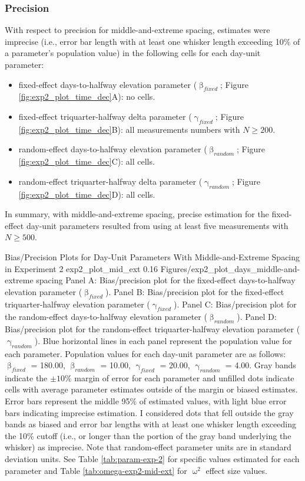 \documentclass[
12pt, %
twoside,
english]{guelphthesis}
\begin{document}
\hypertarget{precision-mid-ext-exp2}{%
\subsubsection{Precision}\label{precision-mid-ext-exp2}}

With respect to precision for middle-and-extreme spacing, estimates were imprecise (i.e., error bar length with at least one whisker length exceeding 10\% of a parameter's population value) in the following cells for each day-unit parameter:
\begin{itemize}
\tightlist
\item
  fixed-effect days-to-halfway elevation parameter (\(\upbeta_{fixed}\); Figure \ref{fig:exp2_plot_time_dec}A): no cells.
\item
  fixed-effect triquarter-halfway delta parameter (\(\upgamma_{fixed}\); Figure \ref{fig:exp2_plot_time_dec}B): all measurements numbers with \(N \ge 200\).
\item
  random-effect days-to-halfway elevation parameter (\(\upbeta_{random}\); Figure \ref{fig:exp2_plot_time_dec}C): all cells.
\item
  random-effect triquarter-halfway delta parameter (\(\upgamma_{random}\); Figure \ref{fig:exp2_plot_time_dec}D): all cells.
\end{itemize}
In summary, with middle-and-extreme spacing, precise estimation for the fixed-effect day-unit parameters resulted from using at least five measurements with \(N \ge 500\).
\begin{apaFigure}
[portrait]
[samepage]
[-0.2cm]
{Bias/Precision Plots for Day-Unit Parameters With Middle-and-Extreme Spacing in Experiment 2}
{exp2_plot_mid_ext}
{0.16}
{Figures/exp2_plot_days_middle-and-extreme spacing}
{Panel A: Bias/precision plot for the fixed-effect days-to-halfway elevation parameter ($\upbeta_{fixed}$). Panel B: Bias/precision plot for the fixed-effect triquarter-halfway elevation parameter ($\upgamma_{fixed}$). Panel C: Bias/precision plot for the random-effect days-to-halfway elevation parameter ($\upbeta_{random}$). Panel D: Bias/precision plot for the random-effect triquarter-halfway elevation parameter ($\upgamma_{random}$). Blue horizontal lines in each panel represent the population value for each parameter. Population values for each day-unit parameter are as follows: $\upbeta_{fixed}$ = 180.00, $\upbeta_{random}$ = 10.00, $\upgamma_{fixed}$ = 20.00, $\upgamma_{random}$ = 4.00. Gray bands indicate the $\pm 10\%$ margin of error for each parameter and unfilled dots indicate cells with average parameter estimates outside of the margin or biased estimates. Error bars represent the middle 95\% of estimated values, with light blue error bars indicating imprecise estimation. I considered dots that fell outside the gray bands as biased and error bar lengths with at least one whisker length exceeding the 10\% cutoff (i.e., or longer than the portion of the gray band underlying the whisker) as imprecise. Note that random-effect parameter units are in standard deviation units. See Table \ref{tab:param-exp-2} for specific values estimated for each parameter and Table \ref{tab:omega-exp2-mid-ext} for $\upomega^2$ effect size values.}
\end{apaFigure}
\end{document}
